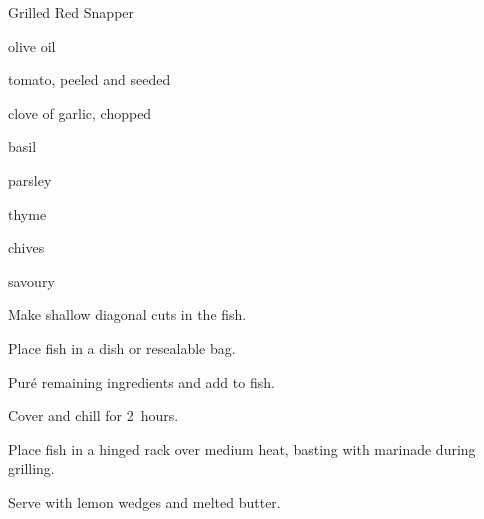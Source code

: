 \begin{recipe}{Grilled Red Snapper}{}{}

\begin{ingredients}
\item {} 
\item \C{\half} olive oil
\item tomato, peeled and seeded
\item clove of garlic, chopped
\item {} basil
\item {} parsley
\item {} thyme
\item {} chives
\item {} savoury
\end{ingredients}

\begin{directions}
\item Make shallow diagonal cuts in the fish.
\item Place fish in a dish or resealable bag.
\item Puré remaining ingredients and add to fish.
\item Cover and chill for 2~hours.
\item Place fish in a hinged rack over medium heat, basting with marinade during grilling.
\item Serve with lemon wedges and melted butter.
\end{directions}

\end{recipe}
